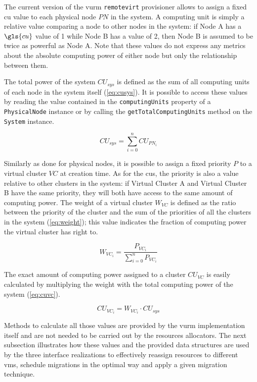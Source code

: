 The current version of the \gls{vurm} \texttt{remotevirt} provisioner allows to assign a fixed \gls{cu} value to each physical node $PN$ in the system. A computing unit is simply a relative value comparing a node to other nodes in the system: if Node A has a $\gls{cu}$ value of 1 while Node B has a value of 2, then Node B is assumed to be twice as powerful as Node A. Note that these values do not express any metrics about the absolute computing power of either node but only the relationship between them.

The total power of the system $CU_{sys}$ is defined as the sum of all computing units of each node in the system itself (\autoref{eq:cusys}). It is possible to access these values by reading the value contained in the \texttt{computingUnits} property of a \texttt{PhysicalNode} instance or by calling the \texttt{getTotalComputingUnits} method on the \texttt{System} instance.

\begin{equation}
	\label{eq:cusys}
	CU_{sys} = \sum_{i=0}^n CU_{PN_i}
\end{equation}

Similarly as done for physical nodes, it is possible to assign a fixed priority $P$ to a virtual cluster $VC$ at creation time. As for the \glspl{cu}, the priority is also a value relative to other clusters in the system: if Virtual Cluster A and Virtual Cluster B have the same priority, they will both have access to the same amount of computing power. The weight of a virtual cluster  $W_{VC}$ is defined as the ratio between the priority of the cluster and the sum of the priorities of all the clusters in the system (\autoref{eq:weight}); this value indicates the fraction of computing power the virtual cluster has right to.

\begin{equation}
	\label{eq:weight}
	W_{VC_i} = \frac{P_{VC_i}}{\sum_{i=0}^n P_{VC_i}}
\end{equation}

The exact amount of computing power assigned to a cluster $CU_{VC}$ is easily calculated by multiplying the weight with the total computing power of the system (\autoref{eq:cuvc}).

\begin{equation}
	\label{eq:cuvc}
	CU_{VC_i} = W_{VC_i} \cdot CU_{sys}
\end{equation}

Methods to calculate all those values are provided by the \gls{vurm} implementation itself and are not needed to be carried out by the resources allocators. The next subsection illustrates how these values and the provided data structures are used by the three interface realizations to effectively reassign resources to different \glspl{vm}, schedule migrations in the optimal way and apply a given migration technique.


